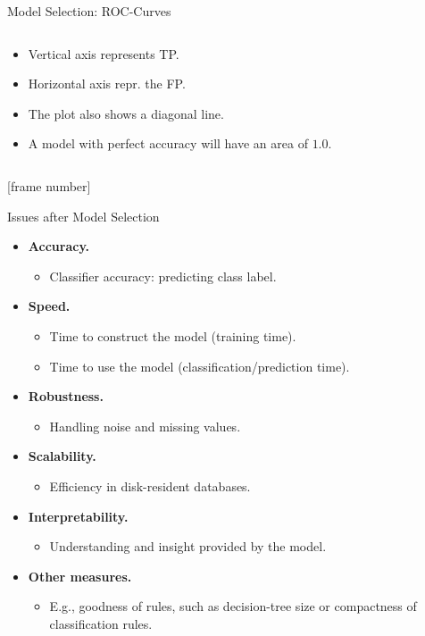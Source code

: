 \documentclass[aspectratio=169,t,table]{beamer}
\begin{document}
{\begin{frame}{Model Selection: ROC-Curves}
\begin{columns}
\begin{column}{0.4\textwidth}
          \begin{itemize}
            \item Vertical axis represents TP.
            \item Horizontal axis repr. the FP.
            \item The plot also shows a diagonal line.
            \item A model with perfect accuracy will have an area of $1.0$.
          \end{itemize}
        \end{column}
      \end{columns}
    \end{frame}
  }

  {
    [frame number]
    \begin{frame}{Issues after Model Selection}
      \begin{itemize}
        \item \textbf{Accuracy.}
        \begin{itemize}
          \item Classifier accuracy: predicting class label.
        \end{itemize}
        \item \textbf{Speed.}
        \begin{itemize}
          \item Time to construct the model (training time).
          \item Time to use the model (classification/prediction time).
        \end{itemize}
        \item \textbf{Robustness.}
        \begin{itemize}
          \item Handling noise and missing values.
        \end{itemize}
        \item \textbf{Scalability.}
        \begin{itemize}
          \item Efficiency in disk-resident databases.
        \end{itemize}
        \item \textbf{Interpretability.}
        \begin{itemize}
          \item Understanding and insight provided by the model.
        \end{itemize}
        \item \textbf{Other measures.}
        \begin{itemize}
          \item E.g., goodness of rules, such as decision-tree size or compactness of classification rules.
        \end{itemize}
      \end{itemize}
    \end{frame}
  }
\end{document}
